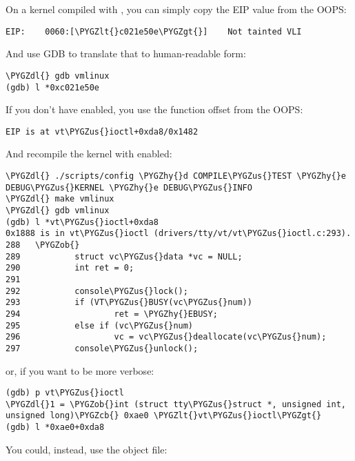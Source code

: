 \documentclass[a4paper,8pt,english]{sphinxmanual}
\def\PYGZus{\char`\_}
\def\PYGZob{\char`\{}
\def\PYGZcb{\char`\}}
\def\PYGZlt{\char`\<}
\def\PYGZgt{\char`\>}
\def\PYGZdl{\char`\$}
\def\PYGZhy{\char`\-}
\begin{document}
On a kernel compiled with , you can simply copy the
EIP value from the OOPS:

\begin{Verbatim}[commandchars=\\\{\}]
EIP:    0060:[\PYGZlt{}c021e50e\PYGZgt{}]    Not tainted VLI
\end{Verbatim}

And use GDB to translate that to human-readable form:

\begin{Verbatim}[commandchars=\\\{\}]
\PYGZdl{} gdb vmlinux
(gdb) l *0xc021e50e
\end{Verbatim}

If you don't have  enabled, you use the function
offset from the OOPS:

\begin{Verbatim}[commandchars=\\\{\}]
EIP is at vt\PYGZus{}ioctl+0xda8/0x1482
\end{Verbatim}

And recompile the kernel with  enabled:

\begin{Verbatim}[commandchars=\\\{\}]
\PYGZdl{} ./scripts/config \PYGZhy{}d COMPILE\PYGZus{}TEST \PYGZhy{}e DEBUG\PYGZus{}KERNEL \PYGZhy{}e DEBUG\PYGZus{}INFO
\PYGZdl{} make vmlinux
\PYGZdl{} gdb vmlinux
(gdb) l *vt\PYGZus{}ioctl+0xda8
0x1888 is in vt\PYGZus{}ioctl (drivers/tty/vt/vt\PYGZus{}ioctl.c:293).
288   \PYGZob{}
289           struct vc\PYGZus{}data *vc = NULL;
290           int ret = 0;
291
292           console\PYGZus{}lock();
293           if (VT\PYGZus{}BUSY(vc\PYGZus{}num))
294                   ret = \PYGZhy{}EBUSY;
295           else if (vc\PYGZus{}num)
296                   vc = vc\PYGZus{}deallocate(vc\PYGZus{}num);
297           console\PYGZus{}unlock();
\end{Verbatim}

or, if you want to be more verbose:

\begin{Verbatim}[commandchars=\\\{\}]
(gdb) p vt\PYGZus{}ioctl
\PYGZdl{}1 = \PYGZob{}int (struct tty\PYGZus{}struct *, unsigned int, unsigned long)\PYGZcb{} 0xae0 \PYGZlt{}vt\PYGZus{}ioctl\PYGZgt{}
(gdb) l *0xae0+0xda8
\end{Verbatim}

You could, instead, use the object file:
\end{document}
